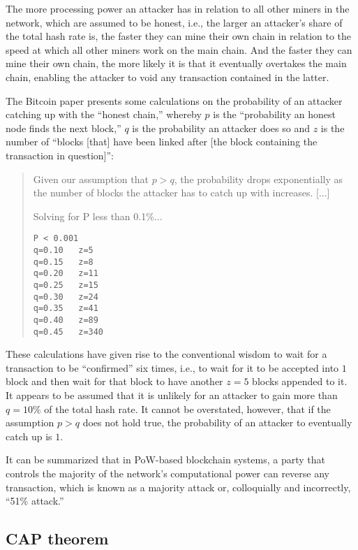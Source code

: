 The more processing power an attacker has in relation to all other miners in the network, which are assumed to be honest, i.e., the larger an attacker's share of the total hash rate is, the faster they can mine their own chain in relation to the speed at which all other miners work on the main chain.
And the faster they can mine their own chain, the more likely it is that it eventually overtakes the main chain, enabling the attacker to void any transaction contained in the latter.

The Bitcoin paper presents some calculations on the probability of an attacker catching up with the ``honest chain,'' whereby $p$ is the ``probability an honest node finds the next block,'' $q$ is the probability an attacker does so and $z$ is the number of ``blocks [that] have been linked after [the block containing the transaction in question]'': \autocite[6, 7, 8]{bitcoin2008paper}

\begin{quote}
	Given our assumption that $p > q$, the probability drops exponentially as the number of blocks the attacker has to catch up with increases. [...]

	Solving for P less than 0.1\%...

	\begin{verbatim}
P < 0.001
q=0.10   z=5
q=0.15   z=8
q=0.20   z=11
q=0.25   z=15
q=0.30   z=24
q=0.35   z=41
q=0.40   z=89
q=0.45   z=340
	\end{verbatim}
\end{quote}

These calculations have given rise to the conventional wisdom to wait for a transaction to be ``confirmed'' \autocite{bitcoinwiki2018confirmation} six times, i.e., to wait for it to be accepted into $1$ block and then wait for that block to have another $z = 5$ blocks appended to it.
It appears to be assumed that it is unlikely for an attacker to gain more than $q = 10\%$ of the total hash rate.
It cannot be overstated, however, that if the assumption $p > q$ does not hold true, the probability of an attacker to eventually catch up is $1$.

It can be summarized that in PoW-based blockchain systems, a party that controls the majority of the network's computational power can reverse any transaction, which is known as a majority attack or, colloquially and incorrectly, ``51\% attack.''

\subsection{CAP theorem}

